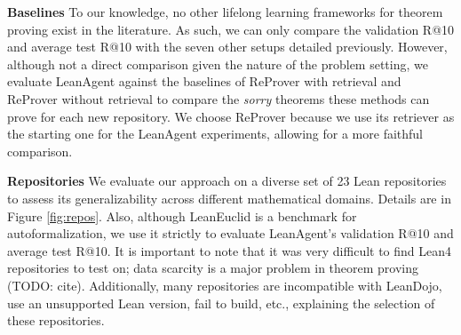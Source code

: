 \documentclass{article} %
\begin{document}
\textbf{Baselines} To our knowledge, no other lifelong learning frameworks for theorem proving exist in the literature. As such, we can only compare the validation R@10 and average test R@10 with the seven other setups detailed previously. However, although not a direct comparison given the nature of the problem setting, we evaluate LeanAgent against the baselines of ReProver with retrieval and ReProver without retrieval to compare the \textit{sorry} theorems these methods can prove for each new repository. We choose ReProver because we use its retriever as the starting one for the LeanAgent experiments, allowing for a more faithful comparison.

\textbf{Repositories} We evaluate our approach on a diverse set of 23 Lean repositories to assess its generalizability across different mathematical domains. Details are in Figure \ref{fig:repos}. Also, although LeanEuclid is a benchmark for autoformalization, we use it strictly to evaluate LeanAgent's validation R@10 and average test R@10. It is important to note that it was very difficult to find Lean4 repositories to test on; data scarcity is a major problem in theorem proving (TODO: cite). Additionally, many repositories are incompatible with LeanDojo, use an unsupported Lean version, fail to build, etc., explaining the selection of these repositories.

\end{document}
